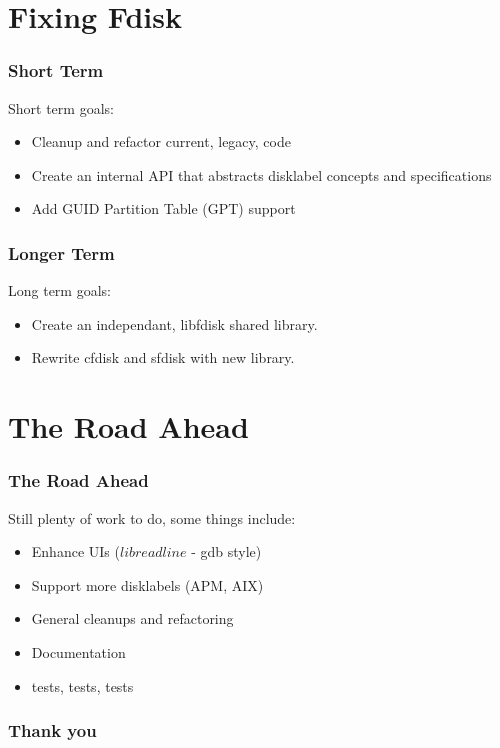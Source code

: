 \documentclass{beamer}
\begin{document}
\section{Fixing Fdisk}
\begin{frame}\frametitle{Short Term}
  Short term goals:
  \begin{itemize}
  \item Cleanup and refactor current, legacy, code
  \item Create an internal API that abstracts disklabel concepts and specifications
  \item Add GUID Partition Table (GPT) support
  \end{itemize} 
\end{frame}

\begin{frame}\frametitle{Longer Term}
  Long term goals:
  \begin{itemize}
  \item Create an independant, libfdisk shared library.
  \item Rewrite cfdisk and sfdisk with new library.
  \end{itemize} 
\end{frame}


\section{The Road Ahead}
\begin{frame}\frametitle{The Road Ahead}
  Still plenty of work to do, some things include:
 \begin{itemize}
  \item Enhance UIs ($libreadline$ - gdb style)
  \item Support more disklabels (APM, AIX)
  \item General cleanups and refactoring
  \item Documentation
  \item tests, tests, tests
  \end{itemize} 
\end{frame}

\begin{frame}\frametitle{Thank you}
\end{frame}
\end{document}
